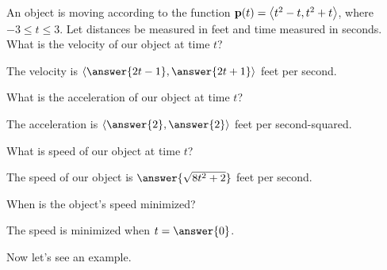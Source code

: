 \documentclass{ximera}
\begin{document}
\begin{question}
  An object is moving according to the function $\mathbf{p}(t) = \left\langle 
    t^2-t,t^2+t\right\rangle$, where $-3\leq t\leq 3$. Let distances be measured in
  feet and time measured in seconds. What is the velocity of our object at time $t$?
  \begin{prompt}
    The velocity is $\vector{\answer{2t-1},\answer{2t+1}}$ feet per
    second.
  \end{prompt}
  \begin{question}
    What is the acceleration of our object at time $t$?
    \begin{prompt}
      The acceleration is $\vector{\answer{2},\answer{2}}$ feet per second-squared.
    \end{prompt}
    \begin{question}
      What is speed of our object at time $t$?
      \begin{prompt}
        The speed of our object is $\answer{\sqrt{8t^2+2}}$ feet per second. 
      \end{prompt}
    \begin{question}
      When is the object's speed minimized?
      \begin{prompt}
        The speed is minimized when $t=\answer{0}$.
      \end{prompt}
    \end{question}
    \end{question}
  \end{question}
\end{question}

Now let's see an example.
\end{document}
